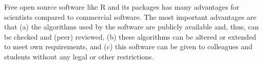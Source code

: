 \documentclass[12pt,english]{article}
\begin{document}
Free open source software like R and its packages has many advantages 
for scientists compared to commercial software.
The most important advantages are that
(a) the algorithms used by the software are publicly available and, thus,
can be checked and (peer) reviewed,
(b) these algorithms can be altered or extended to meet own requirements, and
(c) this software can be given to colleagues and students without any legal 
or other restrictions.


%

\end{document}
